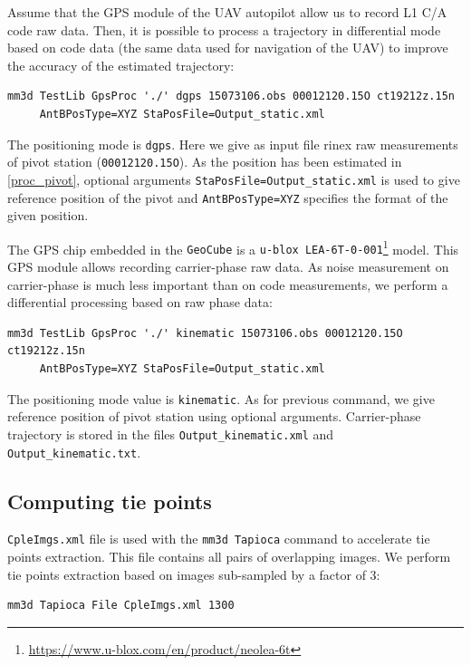 Assume that the GPS module of the UAV autopilot allow us to record L1 C/A code raw data. Then, it is possible to process a trajectory in differential mode based on code data (the same data used for navigation of the UAV) to improve the accuracy of the estimated trajectory:

\begin{verbatim}
mm3d TestLib GpsProc './' dgps 15073106.obs 00012120.15O ct19212z.15n 
     AntBPosType=XYZ StaPosFile=Output_static.xml
\end{verbatim}

The positioning mode is {\tt dgps}. Here we give as input file rinex raw measurements of pivot station ({\tt 00012120.15O}). As the position has been estimated in \ref{proc_pivot}, optional arguments {\tt StaPosFile=Output\_static.xml} is used to give reference position of the pivot and {\tt  AntBPosType=XYZ} specifies the format of the given position.\newline

The GPS chip embedded in the {\tt GeoCube} is a {\tt u-blox LEA-6T-0-001}\footnote{\url{https://www.u-blox.com/en/product/neolea-6t}} model. This GPS module allows recording carrier-phase raw data. As noise measurement on carrier-phase is much less important than on code measurements, we perform a differential processing based on raw phase data:

\begin{verbatim}
mm3d TestLib GpsProc './' kinematic 15073106.obs 00012120.15O ct19212z.15n 
     AntBPosType=XYZ StaPosFile=Output_static.xml
\end{verbatim}

The positioning mode value is {\tt kinematic}. As for previous command, we give reference position of pivot station using optional arguments. Carrier-phase trajectory is stored in the files {\tt Output\_kinematic.xml} and {\tt Output\_kinematic.txt}.


\subsection{Computing tie points}
{\tt CpleImgs.xml} file is used with the {\tt mm3d Tapioca} command to accelerate tie points extraction. This file contains all pairs of overlapping images. We perform tie points extraction based on images sub-sampled by a factor of 3:

\begin{verbatim}
mm3d Tapioca File CpleImgs.xml 1300
\end{verbatim}

